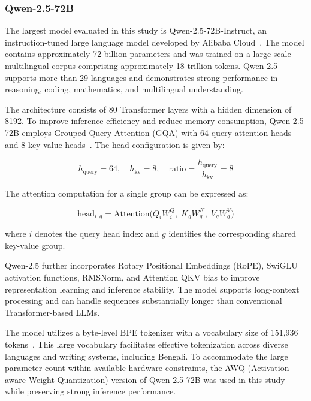 \documentclass[10pt,letterpaper]{article}
\begin{document}
\subsubsection*{Qwen-2.5-72B}

The largest model evaluated in this study is Qwen-2.5-72B-Instruct, an instruction-tuned large language model developed by Alibaba Cloud~\cite{b41}. The model contains approximately 72 billion parameters and was trained on a large-scale multilingual corpus comprising approximately 18 trillion tokens. Qwen-2.5 supports more than 29 languages and demonstrates strong performance in reasoning, coding, mathematics, and multilingual understanding.

The architecture consists of 80 Transformer layers with a hidden dimension of 8192. To improve inference efficiency and reduce memory consumption, Qwen-2.5-72B employs Grouped-Query Attention (GQA) with 64 query attention heads and 8 key-value heads~\cite{b42}. The head configuration is given by:

\begin{equation}
h_{\text{query}} = 64, \quad h_{\text{kv}} = 8, \quad
\text{ratio} = \frac{h_{\text{query}}}{h_{\text{kv}}}=8
\label{eq:qwen_gqa}
\end{equation}

The attention computation for a single group can be expressed as:

\begin{equation}
\text{head}_{i,g} = \text{Attention}\big(Q_iW_i^Q,\; K_gW_g^K,\; V_gW_g^V\big)
\label{eq:qwen_head}
\end{equation}

where \(i\) denotes the query head index and \(g\) identifies the corresponding shared key-value group.

Qwen-2.5 further incorporates Rotary Positional Embeddings (RoPE), SwiGLU activation functions, RMSNorm, and Attention QKV bias to improve representation learning and inference stability. The model supports long-context processing and can handle sequences substantially longer than conventional Transformer-based LLMs.

The model utilizes a byte-level BPE tokenizer with a vocabulary size of 151,936 tokens~\cite{b41}. This large vocabulary facilitates effective tokenization across diverse languages and writing systems, including Bengali. To accommodate the large parameter count within available hardware constraints, the AWQ (Activation-aware Weight Quantization) version of Qwen-2.5-72B was used in this study while preserving strong inference performance.
\end{document}
